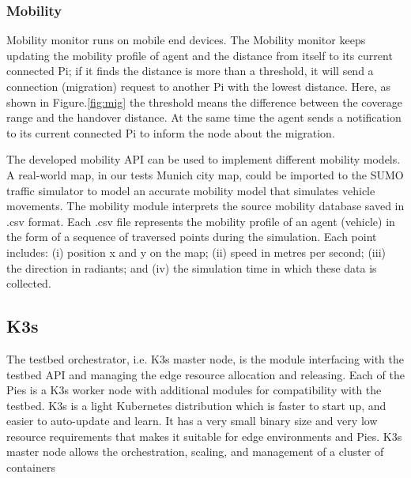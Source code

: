 \documentclass[conference]{IEEEtran}
\begin{document}
\subsubsection{Mobility}
\par Mobility monitor runs on mobile end devices. The Mobility monitor keeps updating the mobility profile of agent and the distance from itself to its current connected Pi; if it finds the distance is more than a threshold, it will send a connection (migration) request to another Pi with the lowest distance. Here, as shown in Figure.\ref{fig:mig} the threshold means the difference between the coverage range and the handover distance. At the same time the agent sends a notification to its current connected Pi to inform the node about the migration.
\par The developed mobility API can be used to implement different mobility models. A real-world map, in our tests Munich city map, could be imported to the SUMO traffic simulator\cite{behrisch2011sumo} to model an accurate mobility model that simulates vehicle movements. The mobility module interprets the source mobility database saved in .csv format.
Each .csv file represents the mobility profile of an agent (vehicle) in the form of a sequence of traversed points during the simulation. Each point includes: (i) position x and y on the map; (ii) speed in metres per second; (iii) the direction in radiants; and (iv) the simulation time in which these data is collected.

\subsection{K3s}
\par The testbed orchestrator, i.e. K3s master node, is the module interfacing with the testbed API and managing the edge resource allocation and releasing. Each of the Pies is a K3s worker node with additional modules for compatibility with the testbed. K3s is a light Kubernetes distribution which is faster to start up, and easier to auto-update and learn. It has a very small binary size and very low resource requirements that makes it suitable for edge environments and Pies.
K3s master node allows the orchestration, scaling, and management of a cluster of containers
\end{document}
